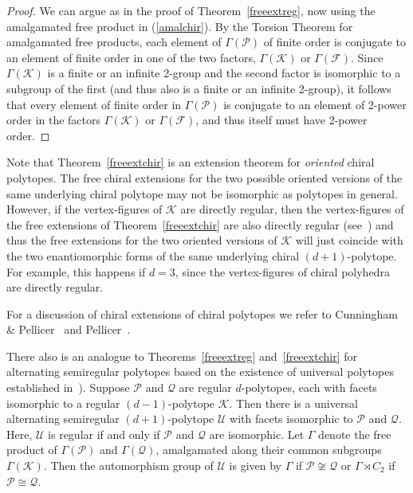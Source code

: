 \documentclass[12pt]{amsart}
\theoremstyle{definition}
\begin{document}
\begin{proof}
We can argue as in the proof of Theorem~\ref{freeextreg}, now using the amalgamated free product in (\ref{amalchir}).  By the Torsion Theorem for amalgamated free products, each element of $\Gamma(\mathcal{P})$ of finite order is conjugate to an element of finite order in one of the two factors, $\Gamma(\mathcal{K})$ or $\Gamma(\mathcal{F})$. Since $\Gamma(\mathcal{K})$ is a finite or an infinite 2-group and the second factor is isomorphic to a subgroup of the first (and thus also is a finite or an infinite 2-group), it follows that every element of finite order in $\Gamma(\mathcal{P})$ is conjugate to an element of 2-power order in the factors $\Gamma(\mathcal{K})$ or $\Gamma(\mathcal{F})$, and thus itself must have 2-power order.
\end{proof}

Note that Theorem~\ref{freeextchir} is an extension theorem for {\it oriented\/} chiral polytopes. The free chiral extensions for the two possible oriented versions of the same underlying chiral polytope may not be isomorphic as polytopes in general. However, if the vertex-figures of $\mathcal K$ are directly regular, then the vertex-figures of the free extensions of Theorem~\ref{freeextchir} are also  directly regular (see~\cite[Thm.~2(e)]{SchWei1995}) and thus the free extensions for the two oriented versions of $\mathcal{K}$ will just coincide with the two enantiomorphic forms of the same underlying chiral $(d+1)$-polytope. For example, this happens if $d=3$, since the vertex-figures of chiral polyhedra are directly regular.

For a discussion of chiral extensions of chiral polytopes we refer to Cunningham \& Pellicer~\cite{CuPe2014} and Pellicer~\cite{Pel2025}.
\smallskip

There also is an analogue to Theorems~\ref{freeextreg} and~\ref{freeextchir} for alternating semiregular polytopes based on the existence of universal polytopes established in~\cite{MonSch2012,MonSch2021}). Suppose $\mathcal{P}$ and $\mathcal{Q}$ are regular $d$-polytopes, each with facets isomorphic to a regular $(d-1)$-polytope $\mathcal{K}$. Then there is a universal alternating semiregular $(d+1)$-polytope $\mathcal{U}$ with facets isomorphic to $\mathcal P$ and $\mathcal Q$. Here, $\mathcal{U}$ is regular if and only if $\mathcal{P}$ and $\mathcal{Q}$ are isomorphic. Let $\Gamma$ denote the free product of $\Gamma(\mathcal{P})$ and $\Gamma(\mathcal{Q})$, amalgamated along their common subgroups $\Gamma(\mathcal{K})$. Then the automorphism group of $\mathcal{U}$ is given by $\Gamma$ if $\mathcal{P}\not\cong\mathcal{Q}$ or $\Gamma\rtimes C_2$ if $\mathcal{P}\cong\mathcal{Q}$.
\end{document}
